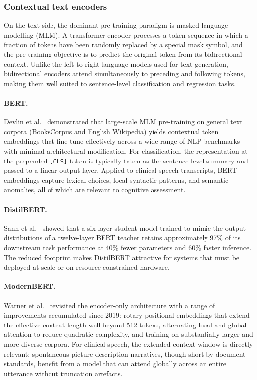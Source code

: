 \subsubsection{Contextual text encoders}
\label{ssec:text_encoders}

On the text side, the dominant pre-training paradigm is masked language modelling (MLM).
A transformer encoder processes a token sequence in which a fraction of tokens have been randomly replaced by a special mask symbol, and the pre-training objective is to predict the original token from its bidirectional context.
Unlike the left-to-right language models used for text generation, bidirectional encoders attend simultaneously to preceding and following tokens, making them well suited to sentence-level classification and regression tasks.

\paragraph{BERT.}
Devlin et al.~\cite{devlin2019bert} demonstrated that large-scale MLM pre-training on general text corpora (BooksCorpus and English Wikipedia) yields contextual token embeddings that fine-tune effectively across a wide range of NLP benchmarks with minimal architectural modification.
For classification, the representation at the prepended \texttt{[CLS]} token is typically taken as the sentence-level summary and passed to a linear output layer.
Applied to clinical speech transcripts, BERT embeddings capture lexical choices, local syntactic patterns, and semantic anomalies, all of which are relevant to cognitive assessment.

\paragraph{DistilBERT.}
Sanh et al.~\cite{sanh2019distilbert} showed that a six-layer student model trained to mimic the output distributions of a twelve-layer BERT teacher retains approximately 97\% of its downstream task performance at 40\% fewer parameters and 60\% faster inference.
The reduced footprint makes DistilBERT attractive for systems that must be deployed at scale or on resource-constrained hardware.

\paragraph{ModernBERT.}
Warner et al.~\cite{warner2025modernbert} revisited the encoder-only architecture with a range of improvements accumulated since 2019: rotary positional embeddings that extend the effective context length well beyond 512 tokens, alternating local and global attention to reduce quadratic complexity, and training on substantially larger and more diverse corpora.
For clinical speech, the extended context window is directly relevant: spontaneous picture-description narratives, though short by document standards, benefit from a model that can attend globally across an entire utterance without truncation artefacts.

